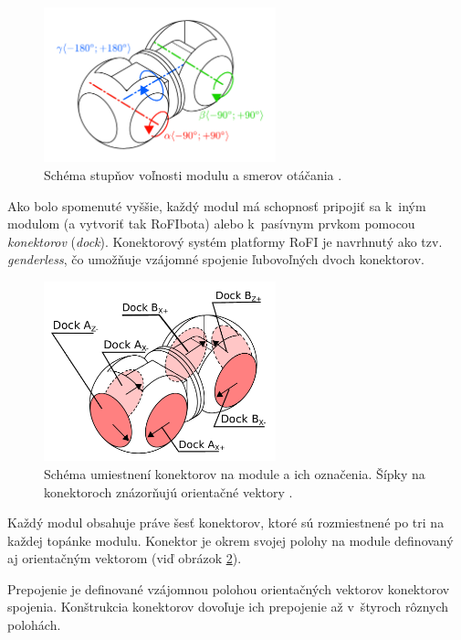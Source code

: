 \documentclass[
  printed, %
  oneside, %
  notable,   %
  nolof,     %
  nolot,     %
]{fithesis3}
\begin{document}
\begin{figure}[hbt!]
    \centering
    \includegraphics[width=0.6\textwidth]{pictures/module_angles.pdf}
    \caption[Stupne voľnosti modulu]{Schéma stupňov voľnosti modulu a smerov otáčania \cite{mrazekMasterThesis}.}
    \label{fig:module_angle}
\end{figure}

Ako bolo spomenuté vyššie, každý modul má schopnosť pripojiť sa k~iným modulom (a vytvoriť tak RoFIbota) alebo k~pasívnym prvkom pomocou \textit{konektorov} (\textit{dock}). Konektorový systém platformy RoFI je navrhnutý ako tzv. \textit{genderless}, čo umožňuje vzájomné spojenie ľubovoľných dvoch konektorov. 

\begin{figure}[hbt!]
    \centering
    \includegraphics[width=0.6\textwidth]{pictures/dock_desc.pdf}
    \caption[Konektory modulu]{Schéma umiestnení konektorov na module a ich označenia. Šípky na konektoroch znázorňujú orientačné vektory \cite{mrazekMasterThesis}.}
    \label{fig:dock_desc}
\end{figure}

Každý modul obsahuje práve šesť konektorov, ktoré sú rozmiestnené po tri na každej topánke modulu. Konektor je okrem svojej polohy na module definovaný aj orientačným vektorom (viď obrázok \ref{fig:dock_desc}). 


Prepojenie je definované vzájomnou polohou orientačných vektorov konektorov spojenia. Konštrukcia konektorov dovoľuje ich prepojenie až v~štyroch rôznych polohách. 
\end{document}
